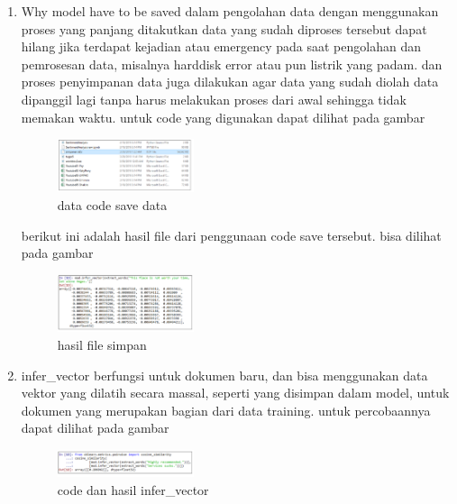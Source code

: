 \begin{enumerate}
        
        \item Why model have to be saved
        \subitem dalam pengolahan data dengan menggunakan proses yang panjang ditakutkan data yang sudah diproses tersebut dapat hilang jika terdapat kejadian atau emergency pada saat pengolahan dan pemrosesan data, misalnya harddisk error atau pun listrik yang padam. dan proses penyimpanan data juga dilakukan agar data yang sudah diolah data dipanggil lagi tanpa harus melakukan proses dari awal sehingga tidak memakan waktu. untuk code yang digunakan dapat dilihat pada gambar
        
        \begin{figure}[H]
            \includegraphics[width=4cm]{figures/1174040/chapter5/27.png}
            \centering
            \caption{data code save data}
        \end{figure}
        
        berikut ini adalah hasil file dari penggunaan code save tersebut. bisa dilihat pada gambar
        \begin{figure}[H]
            \includegraphics[width=4cm]{figures/1174040/chapter5/28.png}
            \centering
            \caption{hasil file simpan}
        \end{figure}
        
        \item infer\_vector
        \subitem berfungsi untuk dokumen baru, dan  bisa menggunakan data vektor yang dilatih secara massal, seperti yang disimpan dalam model, untuk dokumen yang merupakan bagian dari data training. untuk percobaannya dapat dilihat pada gambar
        \begin{figure}[H]
            \includegraphics[width=4cm]{figures/1174040/chapter5/29.png}
            \centering
            \caption{code dan hasil infer\_vector}
        \end{figure}
        

\end{enumerate}
